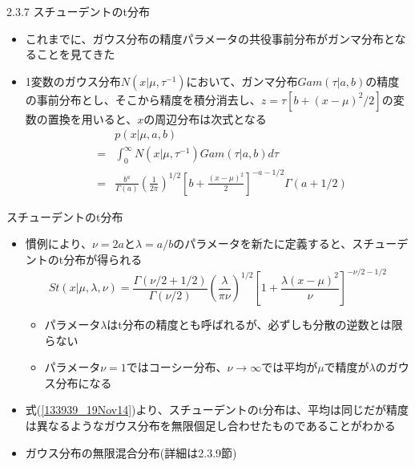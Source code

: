 \begin{frame}{2.3.7 スチューデントのt分布}
 \begin{itemize}
	\item これまでに、ガウス分布の精度パラメータの共役事前分布がガンマ分布となることを見てきた
  \item 1変数のガウス分布$N(x|\mu, \tau^{-1})$において、ガンマ分布$Gam(\tau|a,b)$の精度の事前分布とし、そこから精度を積分消去し、$z=\tau[b+(x-\mu)^2/2]$の変数の置換を用いると、$x$の周辺分布は次式となる
        \begin{eqnarray}
         && p(x|\mu,a,b) \nonumber \\
         &=& \int_0^\infty N(x|\mu,\tau^{-1})Gam(\tau|a,b)d\tau\label{133939_19Nov14} \\
         &= & \frac{b^a}{\Gamma(a)}\left(\frac{1}{2\pi}\right)^{1/2}\left[b+\frac{(x-\mu)^2}{2}\right]^{-a-1/2}\!\!\!\!\!\!\Gamma(a+1/2)
        \end{eqnarray}
 \end{itemize}
\end{frame}

\begin{frame}{スチューデントのt分布}
 \begin{itemize}
  \item 慣例により、$\nu=2a$と$\lambda=a/b$のパラメータを新たに定義すると、\alert{スチューデントのt分布}が得られる
        \begin{equation}
         St(x|\mu,\lambda,\nu) = \frac{\Gamma(\nu/2+1/2)}{\Gamma(\nu/2)}\left(\frac{\lambda}{\pi\nu}\right)^{1/2}\left[1+\frac{\lambda(x-\mu)^2}{\nu}\right]^{-\nu/2-1/2}
        \end{equation}
        \begin{itemize}
         \item パラメータ$\lambda$はt分布の精度とも呼ばれるが、必ずしも分散の逆数とは限らない
         \item パラメータ$\nu=1$ではコーシー分布、$\nu\rightarrow\infty$では平均が$\mu$で精度が$\lambda$のガウス分布になる
        \end{itemize}
  \item 式(\ref{133939_19Nov14})より、スチューデントのt分布は、平均は同じだが精度は異なるようなガウス分布を無限個足し合わせたものであることがわかる
  \item ガウス分布の無限混合分布(詳細は2.3.9節)
 \end{itemize}
\end{frame}


